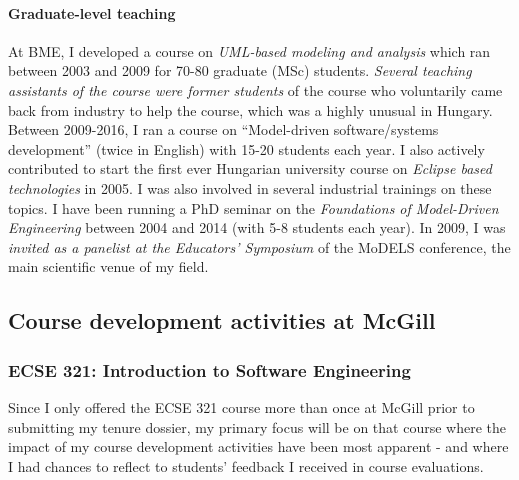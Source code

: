 \paragraph{Graduate-level teaching}
At BME, I developed a course on \emph{UML-based modeling and analysis} which ran between 2003 and 2009 for 70-80 graduate (MSc) students. \emph{Several teaching assistants of the course were former students} of the course who voluntarily came back from industry to help the course, which was a highly unusual in Hungary. Between 2009-2016, I ran a course on “Model-driven software/systems development” (twice in English) with 15-20 students each year. I also actively contributed to start the first ever Hungarian university course on \emph{Eclipse based technologies} in 2005. I was also involved in several industrial trainings on these topics. I have been running a PhD seminar on the \emph{Foundations of Model-Driven Engineering} between 2004 and 2014 (with 5-8 students each year). In 2009, I was \emph{invited as a panelist at the Educators' Symposium} of the MoDELS conference, the main scientific venue of my field. 


\subsection{Course development activities at McGill}


\subsubsection{ECSE 321: Introduction to Software Engineering}

Since I only offered the ECSE 321 course more than once at McGill prior to submitting my tenure dossier, my primary focus will be on that course where the impact of my course development activities have been most apparent - and where I had chances to reflect to students' feedback I received in course evaluations.  



